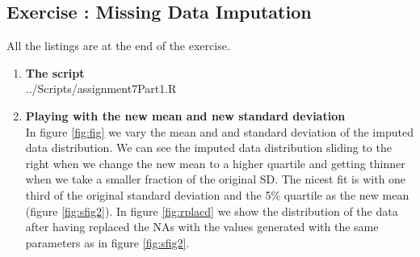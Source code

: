 \documentclass[10pt,a4paper]{article}
\newcommand{\exercise}[1]
{
  \stepcounter{subsection}
  \subsection*{Exercise \thesubsection: #1}

}
\begin{document}
\exercise{Missing Data Imputation}
All the listings are at the end of the exercise. 
\begin{enumerate}

\item \textbf{The script}\\ 
 {../Scripts/assignment7Part1.R}


\item \textbf{Playing with the new mean and new standard deviation}\\

In figure \ref{fig:fig} we vary the mean and and standard deviation of the imputed data distribution. We can see the imputed data distribution sliding to the right when we change the new mean to a higher quartile and getting thinner when we take a smaller fraction of the original SD. The nicest fit is with one third of the original standard deviation and the 5\% quartile as the new mean (figure \ref{fig:sfig2}). In figure \ref{fig:rplacd} we show the distribution of the data after having replaced the NAs with the values generated with the same parameters as in figure \ref{fig:sfig2}.


\end{enumerate}
\end{document}
